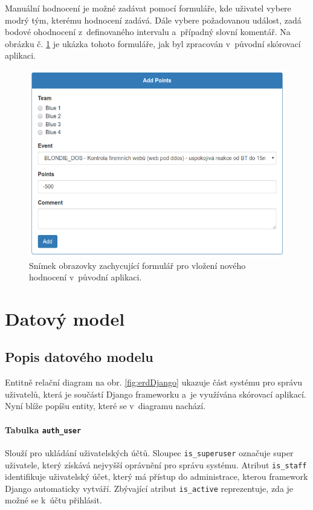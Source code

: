 \documentclass[
  digital,
  twoside,
  table, 
  nolof, 
  nolot
]{fithesis3}
\begin{document}
Manuální hodnocení je možné zadávat pomocí formuláře, kde uživatel vybere modrý tým, kterému hodnocení zadává. Dále vybere požadovanou událost, zadá bodové ohodnocení z~definovaného intervalu a~případný slovní komentář. Na obrázku č. \ref{fig:formScore} je ukázka tohoto formuláře, jak byl zpracován v~původní skórovací aplikaci.

\begin{figure}[h!]
    \centering
    \includegraphics[width=12.8cm]{images/form.png}
    \caption{Snímek obrazovky zachycující formulář pro vložení nového hodnocení v~původní aplikaci.}
    \label{fig:formScore}
\end{figure}

\section{Datový model}
\subsection{Popis datového modelu}

Entitně relační diagram na obr. \ref{fig:erdDjango} ukazuje část systému pro správu uživatelů, která je součástí Django frameworku a~je využívána skórovací aplikací. Nyní blíže popíšu entity, které se v~diagramu nachází.

\paragraph{Tabulka \texttt{auth\_user}} Slouží pro ukládání uživatelských účtů. Sloupec \texttt{is\_superuser} označuje super uživatele, který získává nejvyšší oprávnění pro správu systému. Atribut \texttt{is\_staff} identifikuje uživatelský účet, který má přístup do administrace, kterou framework Django automaticky vytváří. Zbývající atribut \texttt{is\_active} reprezentuje, zda je možné se k~účtu přihlásit.
\end{document}
